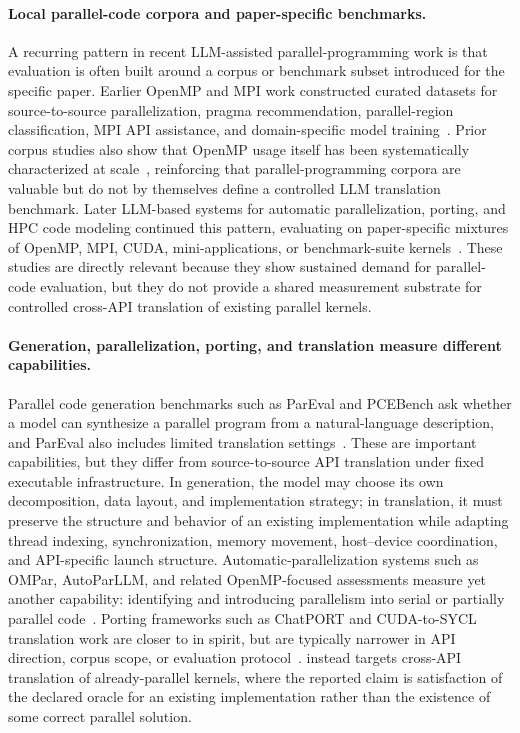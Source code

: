 \paragraph{Local parallel-code corpora and paper-specific benchmarks.}
A recurring pattern in recent LLM-assisted parallel-programming work is that evaluation is often built around a corpus or benchmark subset introduced for the specific paper. Earlier OpenMP and MPI work constructed curated datasets for source-to-source parallelization, pragma recommendation, parallel-region classification, MPI API assistance, and domain-specific model training~\cite{LearningToParallelize2023,MPIRICAL2023,OMPify2023,OpenMPGraphTransformer2023,OMPGPT2024,MPIrigen2024,MonoCoder2024,PragFormer2025,CuratedOpenMPDataset2026}. Prior corpus studies also show that OpenMP usage itself has been systematically characterized at scale~\cite{QuantifyingOpenMP2023}, reinforcing that parallel-programming corpora are valuable but do not by themselves define a controlled LLM translation benchmark. Later LLM-based systems for automatic parallelization, porting, and HPC code modeling continued this pattern, evaluating on paper-specific mixtures of OpenMP, MPI, CUDA, mini-applications, or benchmark-suite kernels~\cite{OMPar2024,AutoParLLM2025,OpenMPAssessment2024,HPCCoder2024,HPCCoderV2,LargeLLMEvalHPC2024,ChatMPI2026,VibeCodeHPC2025}. These studies are directly relevant because they show sustained demand for parallel-code evaluation, but they do not provide a shared measurement substrate for controlled cross-API translation of existing parallel kernels.

\paragraph{Generation, parallelization, porting, and translation measure different capabilities.}
Parallel code generation benchmarks such as ParEval and PCEBench ask whether a model can synthesize a parallel program from a natural-language description, and ParEval also includes limited translation settings~\cite{ParEval2024,PCEBench2025}. These are important capabilities, but they differ from source-to-source API translation under fixed executable infrastructure. In generation, the model may choose its own decomposition, data layout, and implementation strategy; in translation, it must preserve the structure and behavior of an existing implementation while adapting thread indexing, synchronization, memory movement, host--device coordination, and API-specific launch structure. Automatic-parallelization systems such as OMPar, AutoParLLM, and related OpenMP-focused assessments measure yet another capability: identifying and introducing parallelism into serial or partially parallel code~\cite{OMPar2024,AutoParLLM2025,OpenMPAssessment2024}. Porting frameworks such as ChatPORT and CUDA-to-SYCL translation work are closer to \parbench{} in spirit, but are typically narrower in API direction, corpus scope, or evaluation protocol~\cite{ChatPORT2025,ChatPORTSYCL2025}. \parbench{} instead targets cross-API translation of already-parallel kernels, where the reported claim is satisfaction of the declared oracle for an existing implementation rather than the existence of some correct parallel solution.

